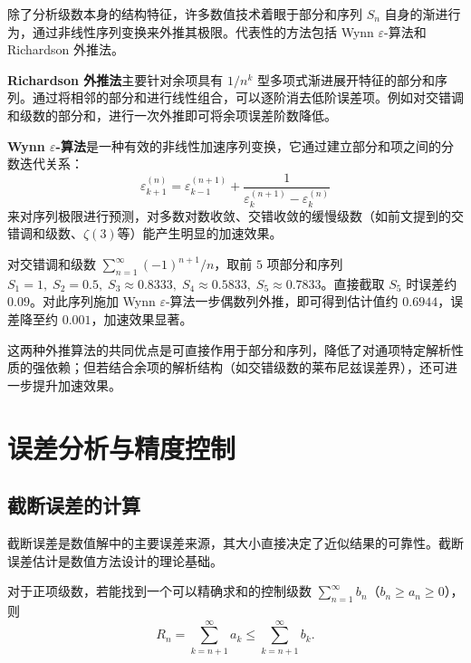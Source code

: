 除了分析级数本身的结构特征，许多数值技术着眼于部分和序列 $S_n$ 自身的渐进行为，通过非线性序列变换来外推其极限。代表性的方法包括 Wynn $\varepsilon$-算法和 Richardson 外推法。

\textbf{Richardson 外推法}主要针对余项具有 $1/n^k$ 型多项式渐进展开特征的部分和序列。通过将相邻的部分和进行线性组合，可以逐阶消去低阶误差项。例如对交错调和级数的部分和，进行一次外推即可将余项误差阶数降低。

\textbf{Wynn $\varepsilon$-算法}是一种有效的非线性加速序列变换，它通过建立部分和项之间的分数迭代关系：
\begin{equation}
\varepsilon_{k+1}^{(n)} = \varepsilon_{k-1}^{(n+1)} + \frac{1}{\varepsilon_{k}^{(n+1)} - \varepsilon_{k}^{(n)}}
\end{equation}
来对序列极限进行预测，对多数对数收敛、交错收敛的缓慢级数（如前文提到的交错调和级数、$\zeta(3)$等）能产生明显的加速效果。

\begin{example}
对交错调和级数 $\displaystyle\sum_{n=1}^{\infty} (-1)^{n+1}/n$，取前 $5$ 项部分和序列 $S_1=1,\; S_2=0.5,\; S_3\approx0.8333,\; S_4\approx0.5833,\; S_5\approx0.7833$。直接截取 $S_5$ 时误差约 $0.09$。对此序列施加 Wynn $\varepsilon$-算法一步偶数列外推，即可得到估计值约 $0.6944$，误差降至约 $0.001$，加速效果显著。
\end{example}

这两种外推算法的共同优点是可直接作用于部分和序列，降低了对通项特定解析性质的强依赖；但若结合余项的解析结构（如交错级数的莱布尼兹误差界），还可进一步提升加速效果。

\section{误差分析与精度控制}

\subsection{截断误差的计算}

截断误差是数值解中的主要误差来源，其大小直接决定了近似结果的可靠性。截断误差估计是数值方法设计的理论基础。

对于正项级数，若能找到一个可以精确求和的控制级数 $\displaystyle \sum_{n=1}^{\infty} b_n$（$b_n \geq a_n \geq 0$），则
\begin{equation}
R_n = \sum_{k=n+1}^{\infty} a_k \leq \sum_{k=n+1}^{\infty} b_k.
\end{equation}


